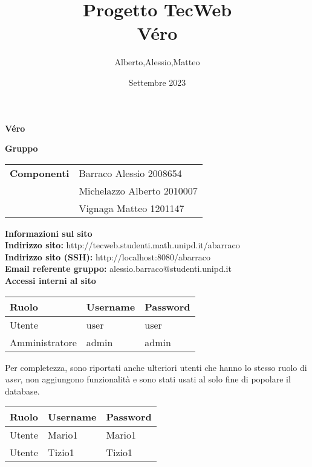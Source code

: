 \documentclass[a4paper, 11pt]{article}
\title{Progetto TecWeb \\ Véro}
\author{Alberto,Alessio,Matteo}
\date{Settembre 2023}
\begin{document}
\begin{center}
	\textbf{\Huge{Véro}}
\end{center}

\vspace{5pt}

\begin{center}
	\textbf{\Large{Gruppo}}
    \begin{table}[H]
        \hspace{3.5cm}
        \renewcommand{\arraystretch}{1.4}
        \begin{tabular}{l | l}
            \textbf{Componenti} & Barraco Alessio 2008654\\
            & Michelazzo Alberto 2010007\\
            & Vignaga Matteo 1201147\\
        \end{tabular}
    \end{table}
\end{center}


\begin{center}
	\textbf{\Large{Informazioni sul sito}}\\
	\vspace{4pt}
	\textbf{Indirizzo sito:} http://tecweb.studenti.math.unipd.it/abarraco \\
	\textbf{Indirizzo sito (SSH):} http://localhost:8080/abarraco \\
	\textbf{Email referente gruppo:} alessio.barraco@studenti.unipd.it \\
    \vspace{1cm}
    \textbf{Accessi interni al sito}
    \begin{longtable}{|l|l|l|}
        \hline
        {Ruolo} & {Username} & {Password} \\ \hline
        Utente         & user     & user     \\ \hline
        Amministratore & admin    & admin \\ \hline
    \end{longtable}
    Per completezza, sono riportati anche ulteriori utenti che hanno lo stesso ruolo di \textit{user}, non aggiungono funzionalità e sono stati usati al solo fine di popolare il database.
    \begin{longtable}{|l|l|l|}
        \hline
        {Ruolo} & {Username} & {Password} \\ \hline
        Utente         & Mario1     & Mario1     \\ \hline
        Utente & Tizio1    & Tizio1 \\ \hline
    \end{longtable}
\end{center}
\end{document}
